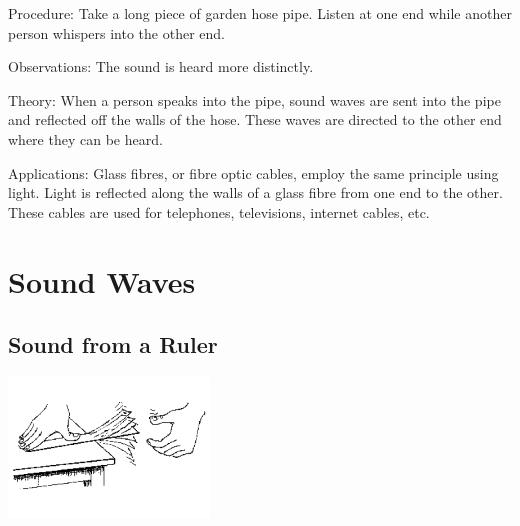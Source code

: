 \begin{multicols}{2}
\begin{description*}
\item[Procedure:]{Take a long piece of garden hose pipe. Listen at one end while another person whispers into the other end.}
\item[Observations:]{The sound is heard more distinctly.}
\item[Theory:]{When a person speaks into the pipe, sound waves are sent into the pipe and reflected off the walls of the hose. These waves are directed to the other end where they can be heard.}
\item[Applications:]{Glass fibres, or fibre optic cables, employ the same principle using light. Light is reflected along the walls of a glass fibre from one end to the other. These cables are used for telephones, televisions, internet cables, etc.}
\end{description*}


\section*{Sound Waves}  


\subsection{Sound from a Ruler}

\begin{center}
\includegraphics[width=0.4\textwidth]{./img/source/sound-ruler.png}
\end{center}


\end{multicols}
